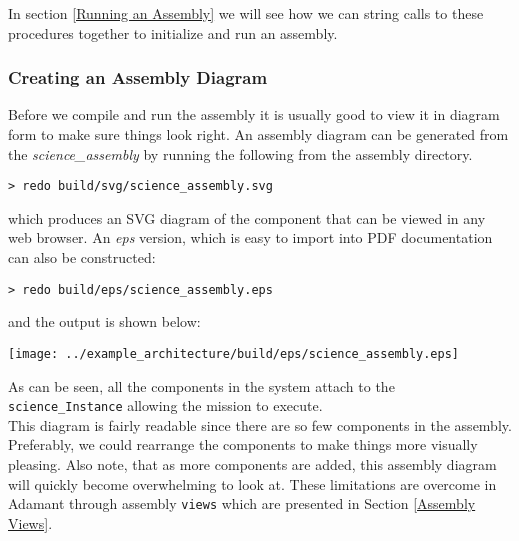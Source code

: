 In section \ref{Running an Assembly} we will see how we can string calls to these procedures together to initialize and run an assembly.

\subsubsection{Creating an Assembly Diagram} \label{Creating an Assembly Diagram}

Before we compile and run the assembly it is usually good to view it in diagram form to make sure things look right. An assembly diagram can be generated from the \textit{science\_assembly} by running the following from the assembly directory.

\vspace{5mm} %
\begin{verbatim}
> redo build/svg/science_assembly.svg
\end{verbatim}
\vspace{5mm} %

which produces an SVG diagram of the component that can be viewed in any web browser. An \textit{eps} version, which is easy to import into PDF documentation can also be constructed:

\vspace{5mm} %
\begin{verbatim}
> redo build/eps/science_assembly.eps
\end{verbatim}
\vspace{5mm} %

and the output is shown below:

\vspace{5mm} %
\texttt{[image: ../example\_architecture/build/eps/science\_assembly.eps]}
\vspace{5mm} %

As can be seen, all the components in the system attach to the \texttt{science\_Instance} allowing the mission to execute. \\

This diagram is fairly readable since there are so few components in the assembly. Preferably, we could rearrange the components to make things more visually pleasing. Also note, that as more components are added, this assembly diagram will quickly become overwhelming to look at. These limitations are overcome in Adamant through assembly \texttt{views} which are presented in Section \ref{Assembly Views}.

